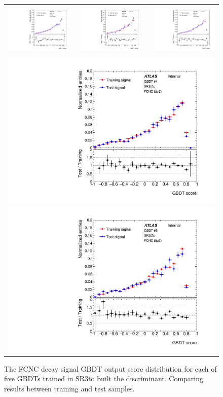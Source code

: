 \begin{figure}[htbp]
	\centering
	\begin{tabular}{ccc}
		\includegraphics[width=.3\textwidth]{Chapters/CH6/figures/SR3_UsingSMT/BDT/GBDT_signal_Fold1} &
		\includegraphics[width=.3\textwidth]{Chapters/CH6/figures/SR3_UsingSMT/BDT/GBDT_signal_Fold2} &
		\includegraphics[width=.3\textwidth]{Chapters/CH6/figures/SR3_UsingSMT/BDT/GBDT_signal_Fold3} \\ 
		\multicolumn{3}{c}{
			\includegraphics[width=.3\textwidth]{Chapters/CH6/figures/SR3_UsingSMT/BDT/GBDT_signal_Fold4}
			\includegraphics[width=.3\textwidth]{Chapters/CH6/figures/SR3_UsingSMT/BDT/GBDT_signal_Fold5}} \\
	\end{tabular}
	\caption{ The FCNC \tZc \ttbar decay signal GBDT output score distribution for each of five GBDTs trained in SR3\tZc to built the \Dthree discriminant. 
		Comparing results between training and test samples.
	}%
	\label{fig:separation:SR3:GBDTsig}
\end{figure}

